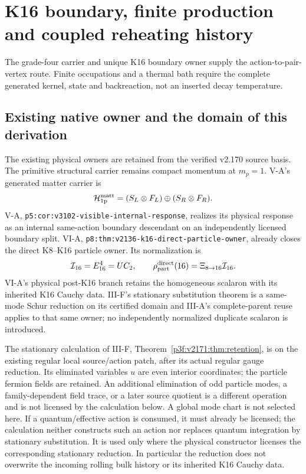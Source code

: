 \documentclass[12pt,a4paper]{article}
\begin{document}


\section{K16 boundary, finite production and coupled reheating history}
\label{p6a:sec:organized-a5}
The grade-four carrier and unique K16 boundary owner supply the action-to-pair-vertex route. Finite occupations and a thermal bath require the complete generated kernel, state and backreaction, not an inserted decay temperature.

\subsection{Existing native owner and the domain of this derivation}
The existing physical owners are retained from the verified v2.170 source basis.
The primitive structural carrier remains compact momentum at $m_p=1$.
V-A's generated matter carrier is
\[
 \mathcal H_{\rm 1p}^{\rm matt}
 =(S_L\otimes F_L)\oplus(S_R\otimes F_R).
\]
V-A, \texttt{p5:cor:v3102-visible-internal-response}, realizes its physical
response as an internal same-action boundary descendant on an independently
licensed boundary split. VI-A,
\texttt{p8:thm:v2136-k16-direct-particle-owner}, already closes the direct
K8--K16 particle owner. Its normalization is
\[
 \mathcal I_{16}=E_{16}^4=UC_2,\qquad
 \rho_{\rm part}^{\rm direct}(16)=\Xi_{8\to16}\mathcal I_{16}.
\]
VI-A's physical post-K16 branch retains the homogeneous scalaron with its
inherited K16 Cauchy data.  III-F's stationary substitution theorem is a
same-mode Schur reduction on its certified domain and III-A's complete-parent
reuse applies to that same owner; no independently normalized duplicate
scalaron is introduced.

The stationary calculation of III-F, Theorem~\ref{p3f:v2171:thm:retention},
is on the existing regular local
source/action patch, after its actual regular gauge reduction. Its eliminated
variables $u$ are even interior coordinates; the particle fermion fields are
retained. An additional elimination of odd particle modes, a family-dependent
field trace, or a later source quotient is a different operation and is not
licensed by the calculation below. A global mode chart is not selected here.
If a quantum/effective action is consumed, it must already be licensed; the
calculation neither constructs such an action nor replaces quantum integration
by stationary substitution.
It is used only where the physical constructor licenses the corresponding
stationary reduction.  In particular the reduction does not overwrite the
incoming rolling bulk history or its inherited K16 Cauchy data.
\end{document}

